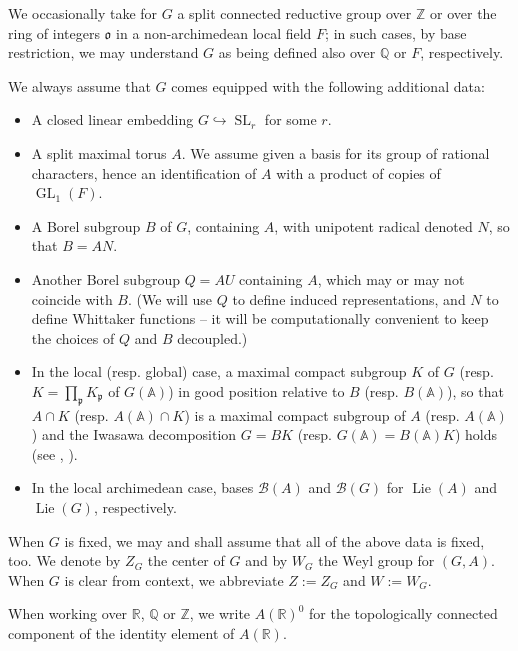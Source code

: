 \documentclass[reqno]{amsart}
\DeclareMathOperator{\SL}{SL}
\DeclareMathOperator{\GL}{GL}
\DeclareMathOperator{\Lie}{Lie}
\theoremstyle{plain} \newtheorem{theorem} {Theorem}
\theoremstyle{definition} \newtheorem{definition} [theorem] {Definition}
\theoremstyle{itplain} %
\numberwithin{equation}{section}
\numberwithin{theorem}{section}
\begin{document}
We occasionally take for $G$ a split connected reductive group over $\mathbb{Z}$ or over the ring of integers $\mathfrak{o}$ in a non-archimedean local field $F$; in such cases, by base restriction, we may understand $G$ as being defined also over $\mathbb{Q}$ or $F$, respectively.


We always assume that $G$ comes equipped with the following additional data:
\begin{itemize}
\item A closed linear embedding $G \hookrightarrow \SL_r$ for some $r$.  
\item A split maximal torus  $A$.  We assume given a basis for its group of rational characters, hence an identification of $A$ with a product of copies of $\GL_1(F)$.
\item A Borel subgroup $B$   of $G$, containing $A$, with unipotent radical denoted $N$, so that $B = A N$.
\item Another Borel subgroup $Q = A U$  containing $A$, which may or may not coincide with $B$.  (We will use $Q$ to define induced representations, and $N$ to define Whittaker functions -- it will be computationally convenient to keep the choices of $Q$ and $B$ decoupled.)
\item In the local (resp. global) case, a maximal compact subgroup  $K$ of $G$ (resp. $K = \prod_\mathfrak{p} K_\mathfrak{p}$ of $G(\mathbb{A})$) in good position relative to $B$ (resp. $B(\mathbb{A})$), so that $A \cap K$ (resp. $A(\mathbb{A}) \cap K$) is a maximal compact subgroup of $A$ (resp. $A(\mathbb{A})$) and the Iwasawa decomposition $G = B K$ (resp. $G(\mathbb{A}) = B(\mathbb{A}) K$) holds (see \cite[I.1.4]{MR1361168}, \cite[Thm A.1.1]{GetzHahn}).
\item In the local archimedean case,  bases $\mathcal{B}(A)$ and $\mathcal{B}(G)$ for $\Lie(A)$ and $\Lie(G)$, respectively.
\end{itemize}
When $G$ is fixed, we may and shall assume that all of the above data is fixed, too.  We denote by $Z_G$ the center of $G$ and by $W_G$ the Weyl group for $(G,A)$.  When $G$ is clear from context, we abbreviate $Z := Z_G$ and $W := W_G$.

When working over $\mathbb{R}$, $\mathbb{Q}$ or $\mathbb{Z}$, we write $A(\mathbb{R})^0$   for the topologically connected component of the identity element of $A(\mathbb{R})$.
\end{document}
